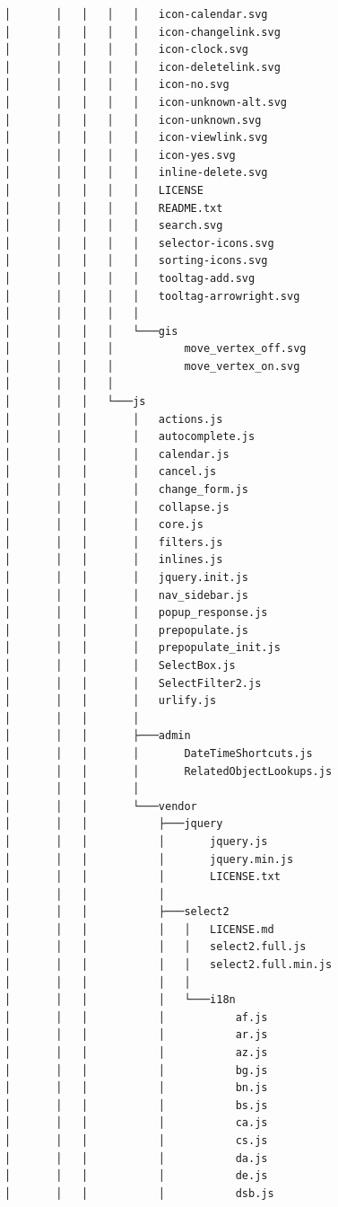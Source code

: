 \documentclass[letterpaper, 12 pt, conference]{ieeeconf}
\begin{document}
\begin{lstlisting}
│       │   │   │   │   icon-calendar.svg
│       │   │   │   │   icon-changelink.svg
│       │   │   │   │   icon-clock.svg
│       │   │   │   │   icon-deletelink.svg
│       │   │   │   │   icon-no.svg
│       │   │   │   │   icon-unknown-alt.svg
│       │   │   │   │   icon-unknown.svg
│       │   │   │   │   icon-viewlink.svg
│       │   │   │   │   icon-yes.svg
│       │   │   │   │   inline-delete.svg
│       │   │   │   │   LICENSE
│       │   │   │   │   README.txt
│       │   │   │   │   search.svg
│       │   │   │   │   selector-icons.svg
│       │   │   │   │   sorting-icons.svg
│       │   │   │   │   tooltag-add.svg
│       │   │   │   │   tooltag-arrowright.svg
│       │   │   │   │
│       │   │   │   └───gis
│       │   │   │           move_vertex_off.svg
│       │   │   │           move_vertex_on.svg
│       │   │   │
│       │   │   └───js
│       │   │       │   actions.js
│       │   │       │   autocomplete.js
│       │   │       │   calendar.js
│       │   │       │   cancel.js
│       │   │       │   change_form.js
│       │   │       │   collapse.js
│       │   │       │   core.js
│       │   │       │   filters.js
│       │   │       │   inlines.js
│       │   │       │   jquery.init.js
│       │   │       │   nav_sidebar.js
│       │   │       │   popup_response.js
│       │   │       │   prepopulate.js
│       │   │       │   prepopulate_init.js
│       │   │       │   SelectBox.js
│       │   │       │   SelectFilter2.js
│       │   │       │   urlify.js
│       │   │       │
│       │   │       ├───admin
│       │   │       │       DateTimeShortcuts.js
│       │   │       │       RelatedObjectLookups.js
│       │   │       │
│       │   │       └───vendor
│       │   │           ├───jquery
│       │   │           │       jquery.js
│       │   │           │       jquery.min.js
│       │   │           │       LICENSE.txt
│       │   │           │
│       │   │           ├───select2
│       │   │           │   │   LICENSE.md
│       │   │           │   │   select2.full.js
│       │   │           │   │   select2.full.min.js
│       │   │           │   │
│       │   │           │   └───i18n
│       │   │           │           af.js
│       │   │           │           ar.js
│       │   │           │           az.js
│       │   │           │           bg.js
│       │   │           │           bn.js
│       │   │           │           bs.js
│       │   │           │           ca.js
│       │   │           │           cs.js
│       │   │           │           da.js
│       │   │           │           de.js
│       │   │           │           dsb.js

\end{lstlisting}
\end{document}
